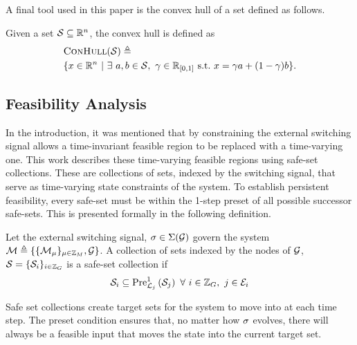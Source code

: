 A final tool used in this paper is the convex hull of a set defined as follows.
\begin{definition}
Given a set $\mathcal{S}\subseteq\real^n$, the convex hull is defined as 
\begin{align*}
&\Call{ConHull}{\mathcal{S}}\triangleq\\&\{x\in\real^n\ |\ \exists\ a,b\in\mathcal{S},\ \gamma\in\real\rii{0}{1}\ \text{s.t.}\ x=\gamma a + (1-\gamma)b\}.
\end{align*}
\end{definition}
\subsection{Feasibility Analysis}
In the introduction, it was mentioned that by constraining the external switching signal allows a time-invariant feasible region to be replaced with a time-varying one. This work describes these time-varying feasible regions using safe-set collections. These are collections of sets, indexed by the switching signal, that serve as time-varying state constraints of the system. To establish persistent feasibility, every safe-set must be within the 1-step preset of all possible successor safe-sets. This is presented formally in the following definition.
\begin{definition}
Let the external switching signal, $\ss\in\Sigma(\graph)$ govern the system $\modes\triangleq\{\{\mode{\modeidx}\}_{\modeidx\in\idxset{\nummodes}}, \graph\}$. A collection of sets indexed by the nodes of $\graph$, $\mathcal{S}=\{\mathcal{S}_{i}\}_{i\in\idxset{\gnumnodes}}$ is a safe-set collection if
$$\mathcal{S}_{i}\subseteq\Pre[\gnodelabel{j}][1]{\mathcal{S}_{j}}\ \forall\ i\in\idxset{\gnumnodes},\ j\in \gnodeedges{i}$$
\end{definition}
Safe set collections create target sets for the system to move into at each time step. The preset condition ensures that, no matter how $\ss$ evolves, there will always be a feasible input that moves the state into the current target set.
